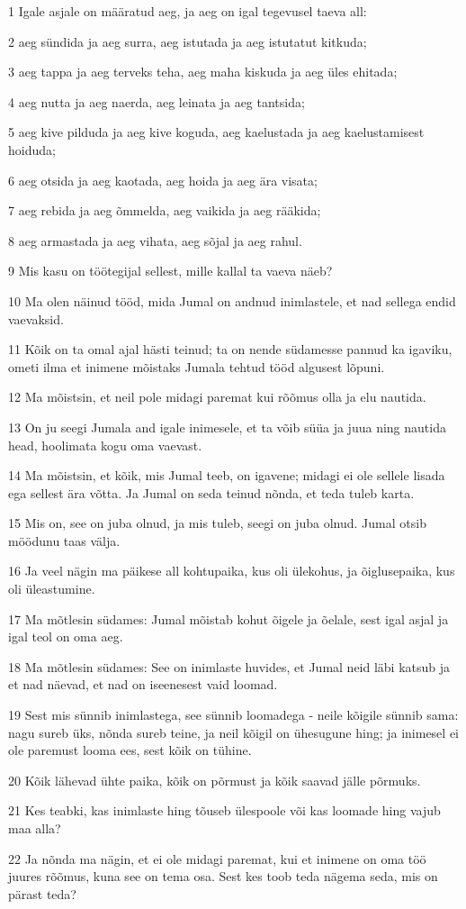 \par 1 Igale asjale on määratud aeg, ja aeg on igal tegevusel taeva all:
\par 2 aeg sündida ja aeg surra, aeg istutada ja aeg istutatut kitkuda;
\par 3 aeg tappa ja aeg terveks teha, aeg maha kiskuda ja aeg üles ehitada;
\par 4 aeg nutta ja aeg naerda, aeg leinata ja aeg tantsida;
\par 5 aeg kive pilduda ja aeg kive koguda, aeg kaelustada ja aeg kaelustamisest hoiduda;
\par 6 aeg otsida ja aeg kaotada, aeg hoida ja aeg ära visata;
\par 7 aeg rebida ja aeg õmmelda, aeg vaikida ja aeg rääkida;
\par 8 aeg armastada ja aeg vihata, aeg sõjal ja aeg rahul.
\par 9 Mis kasu on töötegijal sellest, mille kallal ta vaeva näeb?
\par 10 Ma olen näinud tööd, mida Jumal on andnud inimlastele, et nad sellega endid vaevaksid.
\par 11 Kõik on ta omal ajal hästi teinud; ta on nende südamesse pannud ka igaviku, ometi ilma et inimene mõistaks Jumala tehtud tööd algusest lõpuni.
\par 12 Ma mõistsin, et neil pole midagi paremat kui rõõmus olla ja elu nautida.
\par 13 On ju seegi Jumala and igale inimesele, et ta võib süüa ja juua ning nautida head, hoolimata kogu oma vaevast.
\par 14 Ma mõistsin, et kõik, mis Jumal teeb, on igavene; midagi ei ole sellele lisada ega sellest ära võtta. Ja Jumal on seda teinud nõnda, et teda tuleb karta.
\par 15 Mis on, see on juba olnud, ja mis tuleb, seegi on juba olnud. Jumal otsib möödunu taas välja.
\par 16 Ja veel nägin ma päikese all kohtupaika, kus oli ülekohus, ja õiglusepaika, kus oli üleastumine.
\par 17 Ma mõtlesin südames: Jumal mõistab kohut õigele ja õelale, sest igal asjal ja igal teol on oma aeg.
\par 18 Ma mõtlesin südames: See on inimlaste huvides, et Jumal neid läbi katsub ja et nad näevad, et nad on iseenesest vaid loomad.
\par 19 Sest mis sünnib inimlastega, see sünnib loomadega - neile kõigile sünnib sama: nagu sureb üks, nõnda sureb teine, ja neil kõigil on ühesugune hing; ja inimesel ei ole paremust looma ees, sest kõik on tühine.
\par 20 Kõik lähevad ühte paika, kõik on põrmust ja kõik saavad jälle põrmuks.
\par 21 Kes teabki, kas inimlaste hing tõuseb ülespoole või kas loomade hing vajub maa alla?
\par 22 Ja nõnda ma nägin, et ei ole midagi paremat, kui et inimene on oma töö juures rõõmus, kuna see on tema osa. Sest kes toob teda nägema seda, mis on pärast teda?

